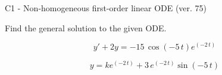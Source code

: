 \begin{exercise}
  \begin{exerciseTitle}C1 - Non-homogeneous first-order linear ODE (ver. 75)\end{exerciseTitle}
  \begin{exerciseStatement}
    
Find the general solution to the given ODE.

    
\[y'+2y= -15 \, \cos\left(-5 \, t\right) e^{\left(-2 \, t\right)}\]

  \end{exerciseStatement}
  \begin{exerciseAnswer}
    
\[y= k e^{\left(-2 \, t\right)} + 3 \, e^{\left(-2 \, t\right)} \sin\left(-5 \, t\right)\]

  \end{exerciseAnswer}
\end{exercise}